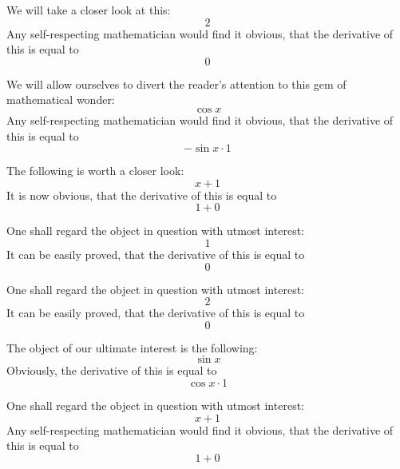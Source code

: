 \documentclass{article}
\begin{document}
We will take a closer look at this:
\begin{equation}
2 
\end{equation}
Any self-respecting mathematician would find it obvious, that the derivative of this is equal to
\begin{equation}
0 
\end{equation}

We will allow ourselves to divert the reader's attention to this gem of mathematical wonder:
\begin{equation}
\cos x 
\end{equation}
Any self-respecting mathematician would find it obvious, that the derivative of this is equal to
\begin{equation}
-\sin x \cdot 1 
\end{equation}

The following is worth a closer look:
\begin{equation}
x + 1 
\end{equation}
It is now obvious, that the derivative of this is equal to
\begin{equation}
1 + 0 
\end{equation}

One shall regard the object in question with utmost interest:
\begin{equation}
1 
\end{equation}
It can be easily proved, that the derivative of this is equal to
\begin{equation}
0 
\end{equation}

One shall regard the object in question with utmost interest:
\begin{equation}
2 
\end{equation}
It can be easily proved, that the derivative of this is equal to
\begin{equation}
0 
\end{equation}

The object of our ultimate interest is the following:
\begin{equation}
\sin x 
\end{equation}
Obviously, the derivative of this is equal to
\begin{equation}
\cos x \cdot 1 
\end{equation}

One shall regard the object in question with utmost interest:
\begin{equation}
x + 1 
\end{equation}
Any self-respecting mathematician would find it obvious, that the derivative of this is equal to
\begin{equation}
1 + 0 
\end{equation}
\end{document}
